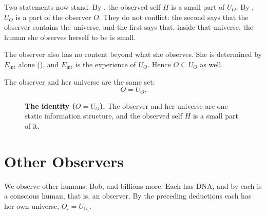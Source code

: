 \documentclass[11pt]{book}
\begin{document}
Two statements now stand. By , the observed self $H$ is a
small part of $U_O$. By , $U_O$ is a part of the
observer $O$. They do not conflict: the second says that the observer
contains the universe, and the first says that, inside that universe, the
human she observes herself to be is small.

The observer also has no content beyond what she observes. She is
determined by $E_{\mathrm{int}}$ alone (), and
$E_{\mathrm{int}}$ is the experience of $U_O$. Hence $O \subseteq U_O$ as
well.

\begin{deduction}\label{ded:identity}
  The observer and her universe are the same set:
  \[
    O = U_O.
  \]
\end{deduction}


\begin{figure}[htbp]
\centering
{}
\caption{\textbf{The identity ($O = U_O$).}
  The observer and her universe are one
  static information structure, and the observed self $H$ is a small part
  of it.}
\label{fig:identity}
\end{figure}


\section{Other Observers}
\label{sec:others}

We observe other humans: Bob, and billions more. Each has DNA, and by
 each is a conscious human, that is, an observer. By the
preceding deductions each has her own universe, $O_i = U_{O_i}$.
\end{document}
